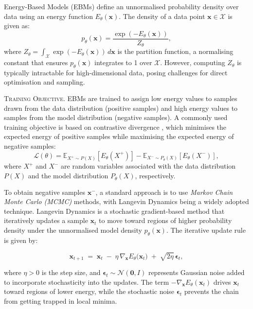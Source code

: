 Energy-Based Models (EBMs) \cite{lecun2006tutorial} define an unnormalised probability density over data using an energy function \( E_\theta(\mathbf{x}) \). The density of a data point \( \mathbf{x} \in \mathcal{X} \) is given as:
\[
p_\theta(\mathbf{x}) = \frac{\exp(-E_\theta(\mathbf{x}))}{Z_\theta},
\]
where \( Z_\theta = \int_{\mathcal{X}} \exp(-E_\theta(\mathbf{x})) \, d\mathbf{x} \) is the partition function, a normalising constant that ensures \( p_\theta(\mathbf{x}) \) integrates to 1 over \( \mathcal{X} \). However, computing \( Z_\theta \) is typically intractable for high-dimensional data, posing challenges for direct optimisation and sampling.

\textsc{Training Objective.} EBMs are trained to assign low energy values to samples drawn from the data distribution (positive samples) and high energy values to samples from the model distribution (negative samples). A commonly used training objective is based on contrastive divergence \cite{hinton2002training}, which minimises the expected energy of positive samples while maximising the expected energy of negative samples:
\[
\mathcal{L}(\theta) = \mathbb{E}_{X^+ \sim P(X)} [E_\theta(X^+)] - \mathbb{E}_{X^- \sim P_\theta(X)} [E_\theta(X^-)],
\]
where \( X^+ \) and \( X^- \) are random variables associated with the data distribution \( P(X) \) and the model distribution \( P_\theta(X) \), respectively. 

To obtain negative samples \(\mathbf{x}^-\), a standard approach is to use \textit{Markov Chain Monte Carlo (MCMC)} methods, with Langevin Dynamics \cite{langevin1908theorie, neal2011mcmc} being a widely adopted technique. Langevin Dynamics is a stochastic gradient-based method that iteratively updates a sample \(\mathbf{x}_t\) to move toward regions of higher probability density under the unnormalised model density \(p_\theta(\mathbf{x})\). The iterative update rule is given by:

\[
\mathbf{x}_{t+1} \;=\; \mathbf{x}_t \;-\; \eta\,\nabla_{\mathbf{x}} E_\theta\bigl(\mathbf{x}_t\bigr) \;+\; \sqrt{2\eta}\,\boldsymbol{\epsilon}_t,
\]

\noindent where \(\eta>0\) is the step size, and \(\boldsymbol{\epsilon}_t \sim \mathcal{N}(\mathbf{0}, I)\) represents Gaussian noise added to incorporate stochasticity into the updates. The term \(-\nabla_{\mathbf{x}} E_\theta(\mathbf{x}_t)\) drives \(\mathbf{x}_t\) toward regions of lower energy, while the stochastic noise \(\boldsymbol{\epsilon}_t\) prevents the chain from getting trapped in local minima.

